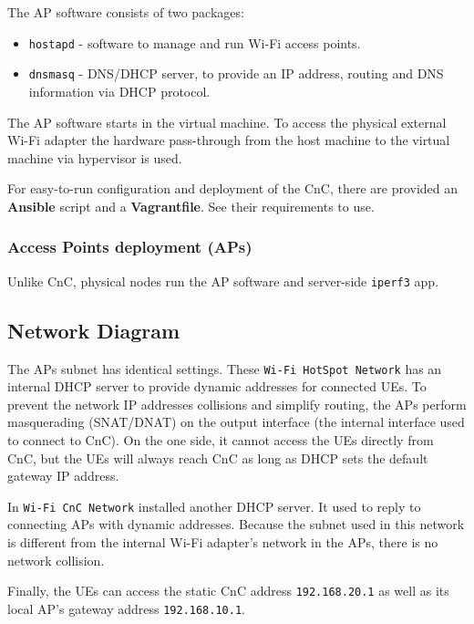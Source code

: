 The AP software consists of two packages:

\begin{itemize}
\tightlist
\item
  \texttt{hostapd} - software to manage and run Wi-Fi access points.
\item
  \texttt{dnsmasq} - DNS/DHCP server, to provide an IP address, routing
  and DNS information via DHCP protocol.
\end{itemize}

The AP software starts in the virtual machine. To access the physical
external Wi-Fi adapter the hardware pass-through from the host machine
to the virtual machine via hypervisor is used.

For easy-to-run configuration and deployment of the CnC, there are
provided an \textbf{Ansible} script and a \textbf{Vagrantfile}. See
their requirements to use.

\hypertarget{access-points-deployment-aps}{%
\subsubsection{Access Points deployment
(APs)}\label{access-points-deployment-aps}}

Unlike CnC, physical nodes run the AP software and server-side
\texttt{iperf3} app.

\hypertarget{network-diagram}{%
\subsection{Network Diagram}\label{network-diagram}}

The APs subnet has identical settings. These
\texttt{Wi-Fi\ HotSpot\ Network} has an internal DHCP server to provide
dynamic addresses for connected UEs. To prevent the network IP addresses
collisions and simplify routing, the APs perform masquerading
(SNAT/DNAT) on the output interface (the internal interface used to
connect to CnC). On the one side, it cannot access the UEs directly from
CnC, but the UEs will always reach CnC as long as DHCP sets the default
gateway IP address.

In \texttt{Wi-Fi\ CnC\ Network} installed another DHCP server. It used
to reply to connecting APs with dynamic addresses. Because the subnet
used in this network is different from the internal Wi-Fi adapter's
network in the APs, there is no network collision.

Finally, the UEs can access the static CnC address \texttt{192.168.20.1}
as well as its local AP's gateway address \texttt{192.168.10.1}.


